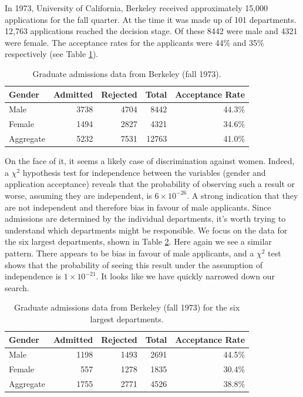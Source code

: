 In 1973, University of California, Berkeley received approximately 15,000 applications for the fall quarter\cite{Berkeley}. At the time it was made up of 101 departments. 12,763 applications reached the decision stage. Of these 8442 were male and 4321 were female. The acceptance rates for the applicants were 44\% and 35\% respectively (see Table \ref{tab_BerkAdm1}).
\begin{table}[h!]
\centering
\caption{Graduate admissions data from Berkeley (fall 1973).}
\label{tab_BerkAdm1}
\vspace{10pt}
\begin{tabular}{|l|r|r|r|r|} %
\hline
Gender     & Admitted & Rejected & Total & Acceptance Rate \\
\hline
\hline
Male       & 3738     & 4704     & 8442  & 44.3\%          \\
Female     & 1494     & 2827     & 4321  & 34.6\%          \\
\hline
\hline
Aggregate  & 5232     & 7531     & 12763 & 41.0\%          \\
\hline
\end{tabular}
\end{table}

On the face of it, it seems a likely case of discrimination against women. Indeed, a $\chi^2$ hypothesis test for independence between the variables (gender and application acceptance) reveals that the probability of observing such a result or worse, assuming they are independent, is $6\times10^{-26}$. A strong indication that they are not independent and therefore bias in favour of male applicants. Since admissions are determined by the individual departments, it's worth trying to understand which departments might be responsible. We focus on the data for the six largest departments, shown in Table \ref{tab_BerkAdm2}. Here again we see a similar pattern. There appears to be bias in favour of male applicants, and a $\chi^2$ test shows that the probability of seeing this result under the assumption of independence is  $1\times10^{-21}$. It looks like we have quickly narrowed down our search.
%
\begin{table}[h!]
\centering
\caption{Graduate admissions data from Berkeley (fall 1973) for the six largest departments.}
\label{tab_BerkAdm2}
\vspace{10pt}
\begin{tabular}{|l|r|r|r|r|} %
\hline
Gender     & Admitted & Rejected & Total & Acceptance Rate \\
\hline
\hline
Male       & 1198     & 1493     & 2691  & 44.5\%          \\
Female     & 557      & 1278     & 1835  & 30.4\%          \\
\hline
\hline
Aggregate  & 1755     & 2771     & 4526  & 38.8\%          \\
\hline
\end{tabular}
\end{table}

